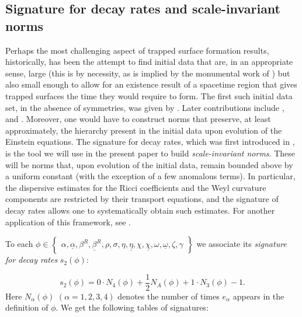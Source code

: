 \documentclass{amsart}
\newcommand{\tbeta}{\beta^R}
\newcommand{\tbetabar}{\betabar^R}
\newcommand{\omegabar}{\underline{\omega}}
\newcommand{\chibar}{\underline{\chi}}
\newcommand{\alphabar}{\underline{\alpha}}
\newcommand{\betabar}{\underline{\beta}}
\newcommand{\etabar}{\underline{\eta}}
\begin{document}
\subsection{Signature for decay rates and scale-invariant norms}
\label{signature}
\noindent Perhaps the most challenging aspect of trapped surface formation results, historically, has been the attempt to find initial data that are, in an appropriate sense, large (this is by necessity, as is implied by the monumental work of \cite{ChrKl}) but also small enough to allow for an existence result of a spacetime region that gives trapped surfaces the time they would require to form. The first such initial data set, in the absence of symmetries, was given by \cite{christodoulou}. Later contributions include \cite{Kl-Rod}, \cite{AL17} and \cite{A17}. Moreover, one would have to construct norms that preserve, at least approximately, the hierarchy present in the initial data upon evolution of the Einstein equations. The signature for decay rates, which was first introduced in \cite{AnThesis}, is the tool we will use in the present paper to build \textit{scale-invariant norms}. These will be norms that, upon evolution of the initial data, remain bounded above by a uniform constant (with the exception of a few anomalous terms). In particular, the dispersive estimates for the Ricci coefficients and the Weyl curvature components are restricted by their transport equations, and the signature of decay rates allows one to systematically obtain such estimates. For another application of this framework, see \cite{AnAth}.

\vspace{3mm}

\noindent To each $\phi \in \begin{Bmatrix}
\alpha, \alphabar, \tbeta, \tbetabar, \rho, \sigma, \eta, \etabar, \chi, \chibar, \omega, \omegabar, \zeta,\gamma
\end{Bmatrix}$ we associate its \textit{signature for decay rates} $s_2(\phi)$:

\[ s_2(\phi) = 0\cdot N_4(\phi) + \frac{1}{2}N_A(\phi) + 1\cdot N_3(\phi)-1.\]Here $N_\alpha(\phi)$ $(\alpha = 1,2,3,4)$ denotes the number of times $e_\alpha$ appears in the definition of $\phi$. We get the following tables of signatures:
\end{document}
